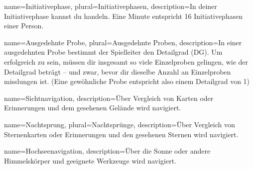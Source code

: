 {
    name=Initiativephase,
    plural=Initiativephasen,
    description={In deiner Initiativephase kannst du handeln. Eine Minute entspricht 16 Initiativephasen einer Person.}
}

{
    name={Ausgedehnte Probe},
    plural={Ausgedehnte Proben},
    description={In einer ausgedehnten Probe bestimmt der Spielleiter den Detailgrad (DG). Um erfolgreich zu sein, müssen dir insgesamt so viele Einzelproben gelingen, wie der Detailgrad beträgt – und zwar, bevor dir dieselbe Anzahl an Einzelproben
misslungen ist. (Eine gewöhnliche Probe entspricht also einem Detailgrad von 1)}
}

{
    name=Sichtnavigation,
    description={Über Vergleich von Karten oder Erinnerungen und dem gesehenen Gelände wird navigiert.}
}

{
    name=Nachtsprung,
    plural={Nachtsprünge},
    description={Über Vergleich von Sternenkarten oder Erinnerungen und den gesehenen Sternen wird navigiert.}
}

{
    name=Hochseenavigation,
    description={Über die Sonne oder andere Himmelskörper und geeignete Werkzeuge wird navigiert.}
}

